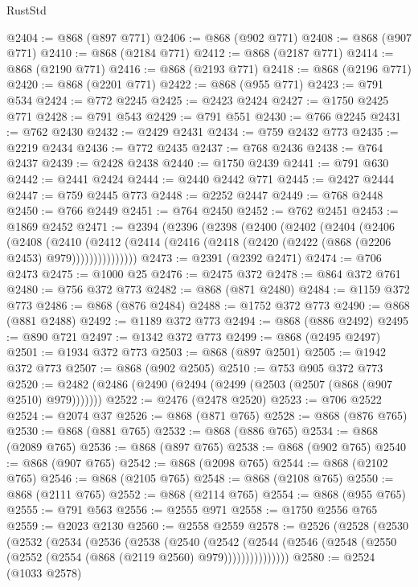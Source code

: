 \begin{lexlean}{RustStd}
\begin{coremodule}
@2404 := @868 (@897 @771)
@2406 := @868 (@902 @771)
@2408 := @868 (@907 @771)
@2410 := @868 (@2184 @771)
@2412 := @868 (@2187 @771)
@2414 := @868 (@2190 @771)
@2416 := @868 (@2193 @771)
@2418 := @868 (@2196 @771)
@2420 := @868 (@2201 @771)
@2422 := @868 (@955 @771)
@2423 := @791 @534
@2424 := @772 @2245
@2425 := @2423 @2424
@2427 := @1750 @2425 @771
@2428 := @791 @543
@2429 := @791 @551
@2430 := @766 @2245
@2431 := @762 @2430
@2432 := @2429 @2431
@2434 := @759 @2432 @773
@2435 := @2219 @2434
@2436 := @772 @2435
@2437 := @768 @2436
@2438 := @764 @2437
@2439 := @2428 @2438
@2440 := @1750 @2439
@2441 := @791 @630
@2442 := @2441 @2424
@2444 := @2440 @2442 @771
@2445 := @2427 @2444
@2447 := @759 @2445 @773
@2448 := @2252 @2447
@2449 := @768 @2448
@2450 := @766 @2449
@2451 := @764 @2450
@2452 := @762 @2451
@2453 := @1869 @2452
@2471 := @2394
    (@2396
      (@2398
        (@2400
          (@2402
            (@2404
              (@2406
                (@2408
                  (@2410
                    (@2412
                      (@2414 (@2416 (@2418 (@2420 (@2422 (@868 (@2206 @2453) @979)))))))))))))))
@2473 := @2391 (@2392 @2471)
@2474 := @706 @2473
@2475 := @1000 @25
@2476 := @2475 @372
@2478 := @864 @372 @761
@2480 := @756 @372 @773
@2482 := @868 (@871 @2480)
@2484 := @1159 @372 @773
@2486 := @868 (@876 @2484)
@2488 := @1752 @372 @773
@2490 := @868 (@881 @2488)
@2492 := @1189 @372 @773
@2494 := @868 (@886 @2492)
@2495 := @890 @721
@2497 := @1342 @372 @773
@2499 := @868 (@2495 @2497)
@2501 := @1934 @372 @773
@2503 := @868 (@897 @2501)
@2505 := @1942 @372 @773
@2507 := @868 (@902 @2505)
@2510 := @753 @905 @372 @773
@2520 := @2482 (@2486 (@2490 (@2494 (@2499 (@2503 (@2507 (@868 (@907 @2510) @979)))))))
@2522 := @2476 (@2478 @2520)
@2523 := @706 @2522
@2524 := @2074 @37
@2526 := @868 (@871 @765)
@2528 := @868 (@876 @765)
@2530 := @868 (@881 @765)
@2532 := @868 (@886 @765)
@2534 := @868 (@2089 @765)
@2536 := @868 (@897 @765)
@2538 := @868 (@902 @765)
@2540 := @868 (@907 @765)
@2542 := @868 (@2098 @765)
@2544 := @868 (@2102 @765)
@2546 := @868 (@2105 @765)
@2548 := @868 (@2108 @765)
@2550 := @868 (@2111 @765)
@2552 := @868 (@2114 @765)
@2554 := @868 (@955 @765)
@2555 := @791 @563
@2556 := @2555 @971
@2558 := @1750 @2556 @765
@2559 := @2023 @2130
@2560 := @2558 @2559
@2578 := @2526
    (@2528
      (@2530
        (@2532
          (@2534
            (@2536
              (@2538
                (@2540
                  (@2542
                    (@2544
                      (@2546 (@2548 (@2550 (@2552 (@2554 (@868 (@2119 @2560) @979)))))))))))))))
@2580 := @2524 (@1033 @2578)

\end{coremodule}
\end{lexlean}
